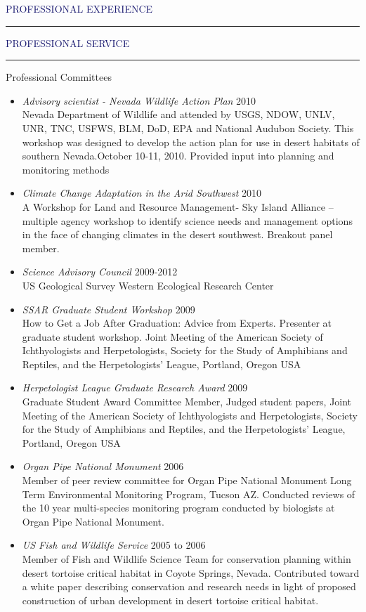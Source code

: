 \documentclass{resume} %
\renewenvironment{rSection}[1]{
\sectionskip
\textcolor{MidnightBlue}{\MakeUppercase{#1}}
\sectionlineskip
\hrule
\begin{list}{}{
\setlength{\leftmargin}{1.5em}
}
\item[]
}{
\end{list}
}
\begin{document}
\begin{rSection}{Professional Experience}
\begin{rSection}{Professional Service}
\begin{rSubsection}{Professional Committees}{}{}{}
\begin{itemize}
\item \textit{Advisory scientist - Nevada Wildlife Action Plan} \hfill 2010 \\
Nevada Department of Wildlife and attended by USGS, NDOW, UNLV, UNR, TNC, USFWS, BLM, DoD, EPA and National Audubon Society. This workshop was designed to develop the action plan for use in desert habitats of southern Nevada.October 10-11, 2010. Provided input into planning and monitoring methods 
\item \textit{Climate Change Adaptation in the Arid Southwest} \hfill 2010 \\  
A Workshop for Land and Resource Management- Sky Island Alliance – multiple agency workshop to identify science needs and management options in the face of changing climates in the desert southwest. Breakout panel member.
\item \textit{Science Advisory Council}  \hfill 2009-2012 \\
 US Geological Survey Western Ecological Research Center
\item \textit{SSAR Graduate Student Workshop} \hfill 2009 \\ 
How to Get a Job After Graduation: Advice from Experts. Presenter at graduate student workshop. Joint Meeting of the American Society of Ichthyologists and Herpetologists, Society for the Study of Amphibians and Reptiles, and the Herpetologists' League, Portland, Oregon USA
\item \textit{Herpetologist League Graduate Research Award} \hfill 2009 \\ 
Graduate Student Award Committee Member, Judged student papers, Joint Meeting of the American Society of Ichthyologists and Herpetologists, Society for the Study of Amphibians and Reptiles, and the Herpetologists' League, Portland, Oregon USA
\item \textit{Organ Pipe National Monument} \hfill 2006 \\
Member of peer review committee for Organ Pipe National Monument Long Term Environmental Monitoring Program, Tucson AZ. Conducted reviews of the 10 year multi-species monitoring program conducted by biologists at Organ Pipe National Monument.
\item \textit{US Fish and Wildlife Service} \hfill 2005 to 2006 \\ Member of Fish and Wildlife Science Team for conservation planning within desert tortoise critical habitat in Coyote Springs, Nevada. Contributed toward a white paper describing conservation and research needs in light of proposed construction of urban development in desert tortoise critical habitat.

\end{itemize}
\end{rSubsection}
\end{rSection}
\end{rSection}
\end{document}
